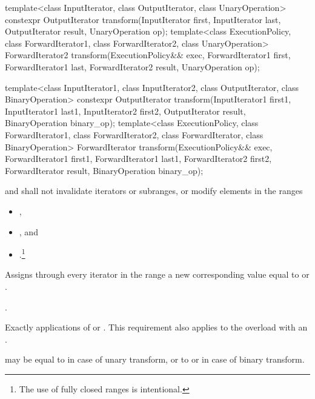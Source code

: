 %
\begin{itemdecl}
template<class InputIterator, class OutputIterator,
         class UnaryOperation>
  constexpr OutputIterator
    transform(InputIterator first, InputIterator last,
              OutputIterator result, UnaryOperation op);
template<class ExecutionPolicy, class ForwardIterator1, class ForwardIterator2,
         class UnaryOperation>
  ForwardIterator2
    transform(ExecutionPolicy&& exec,
              ForwardIterator1 first, ForwardIterator1 last,
              ForwardIterator2 result, UnaryOperation op);

template<class InputIterator1, class InputIterator2,
         class OutputIterator, class BinaryOperation>
  constexpr OutputIterator
    transform(InputIterator1 first1, InputIterator1 last1,
              InputIterator2 first2, OutputIterator result,
              BinaryOperation binary_op);
template<class ExecutionPolicy, class ForwardIterator1, class ForwardIterator2,
         class ForwardIterator, class BinaryOperation>
  ForwardIterator
    transform(ExecutionPolicy&& exec,
              ForwardIterator1 first1, ForwardIterator1 last1,
              ForwardIterator2 first2, ForwardIterator result,
              BinaryOperation binary_op);
\end{itemdecl}

\begin{itemdescr}
\pnum
\requires
{} and 
shall not invalidate iterators or subranges, or modify elements in the ranges
\begin{itemize}
\item {},
\item {}, and
\item {}.\footnote{The use of fully
closed ranges is intentional.}
\end{itemize}

\pnum
\effects
Assigns through every iterator
in the range
a new
corresponding value equal to
or
.

\pnum
\returns
{}.

\pnum
\complexity
Exactly
applications of
 or .  This requirement also applies to the overload
with an  .

\pnum
\remarks
{} may be equal to 
in case of unary transform,
or to  or 
in case of binary transform.
\end{itemdescr}

